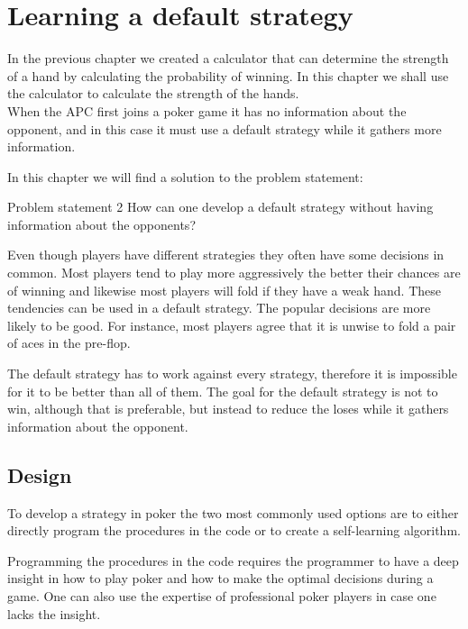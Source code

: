 \section{Learning a default strategy}
\label{sec:part2}
In the previous chapter we created a calculator that can determine the strength of a hand by calculating the probability of winning. In this chapter we shall use the calculator to calculate the strength of the hands.\\

When the APC first joins a poker game it has no information about the opponent, and in this case it must use a default strategy while it gathers more information.

In this chapter we will find a solution to the problem statement:

\vspace{4mm}
\begin{statementBox2}{Problem statement 2}
How can one develop a default strategy without having information about the opponents?
\end{statementBox2}
\vspace{4mm}

Even though players have different strategies they often have some decisions in common. Most players tend to play more aggressively the better their chances are of winning and likewise most players will fold if they have a weak hand. These tendencies can be used in a default strategy. The popular decisions are more likely to be good. For instance, most players agree that it is unwise to fold a pair of aces in the pre-flop. 

The default strategy has to work against every strategy, therefore it is impossible for it to be better than all of them. The goal for the default strategy is not to win, although that is preferable, but instead to reduce the loses while it gathers information about the opponent.

\subsection{Design}
To develop a strategy in poker the two most commonly used options are to either directly program the procedures in the code or to create a self-learning algorithm. 

Programming the procedures in the code requires the programmer to have a deep insight in how to play poker and how to make the optimal decisions during a game. One can also use the expertise of professional poker players in case one lacks the insight.

